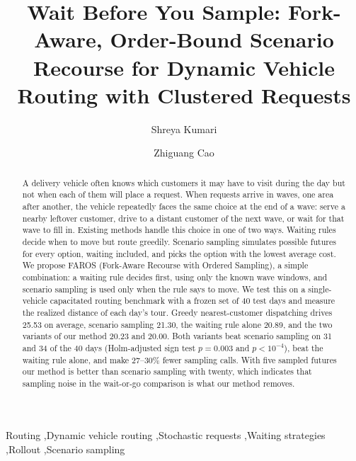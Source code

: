 \documentclass[5p,times,authoryear]{elsarticle}
\begin{document}
\begin{frontmatter}

\title{Wait Before You Sample: Fork-Aware, Order-Bound Scenario Recourse for Dynamic Vehicle Routing with Clustered Requests}

\author[1]{Shreya Kumari}
\author[2]{Zhiguang Cao}
\address[1]{Technology Control Company, Riyadh, Saudi Arabia}
\address[2]{National University of Singapore, Singapore}

\begin{abstract}
A delivery vehicle often knows which customers it may have to visit during the day but not when each of them will place a request. When requests arrive in waves, one area after another, the vehicle repeatedly faces the same choice at the end of a wave: serve a nearby leftover customer, drive to a distant customer of the next wave, or wait for that wave to fill in. Existing methods handle this choice in one of two ways. Waiting rules decide when to move but route greedily. Scenario sampling simulates possible futures for every option, waiting included, and picks the option with the lowest average cost. We propose FAROS (Fork-Aware Recourse with Ordered Sampling), a simple combination: a waiting rule decides first, using only the known wave windows, and scenario sampling is used only when the rule says to move. We test this on a single-vehicle capacitated routing benchmark with a frozen set of 40 test days and measure the realized distance of each day's tour. Greedy nearest-customer dispatching drives 25.53 on average, scenario sampling 21.30, the waiting rule alone 20.89, and the two variants of our method 20.23 and 20.00. Both variants beat scenario sampling on 31 and 34 of the 40 days (Holm-adjusted sign test $p=0.003$ and $p<10^{-4}$), beat the waiting rule alone, and make 27--30\% fewer sampling calls. With five sampled futures our method is better than scenario sampling with twenty, which indicates that sampling noise in the wait-or-go comparison is what our method removes.
\end{abstract}

\begin{keyword}
Routing \sep Dynamic vehicle routing \sep Stochastic requests \sep Waiting strategies \sep Rollout \sep Scenario sampling
\end{keyword}

\end{frontmatter}
\end{document}
